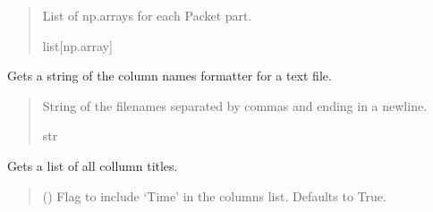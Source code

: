 \documentclass[letterpaper,10pt,english]{sphinxmanual}
\begin{document}
\begin{fulllineitems}
\begin{fulllineitems}
\begin{quote}
\begin{description}
\sphinxAtStartPar
List of np.arrays for each Packet part.

\sphinxAtStartPar
list{[}np.array{]}

\end{description}\end{quote}

\end{fulllineitems}


\begin{fulllineitems}
\label{\detokenize{PodApi.Stream.PodHandler:PodApi.Stream.PodHandler.Handle8274D.Drain8274D.GetDeviceColNames}}
\pysigstartsignatures
{}
\pysigstopsignatures
\sphinxAtStartPar
Gets a string of the column names formatter for a text file.
\begin{quote}\begin{description}
\sphinxAtStartPar
String of the filenames separated by commas and ending in a newline.

\sphinxAtStartPar
str

\end{description}\end{quote}

\end{fulllineitems}


\begin{fulllineitems}
\label{\detokenize{PodApi.Stream.PodHandler:PodApi.Stream.PodHandler.Handle8274D.Drain8274D.GetDeviceColNamesList}}
\pysigstartsignatures
{}
\pysigstopsignatures
\sphinxAtStartPar
Gets a list of all collumn titles.
\begin{quote}\begin{description}
\sphinxAtStartPar
{} (\sphinxstyleliteralemphasis{\sphinxupquote{, }}) \textendash{} Flag to include ‘Time’ in the columns list.                 Defaults to True.


\end{description}
\end{quote}
\end{fulllineitems}
\end{fulllineitems}
\end{document}
